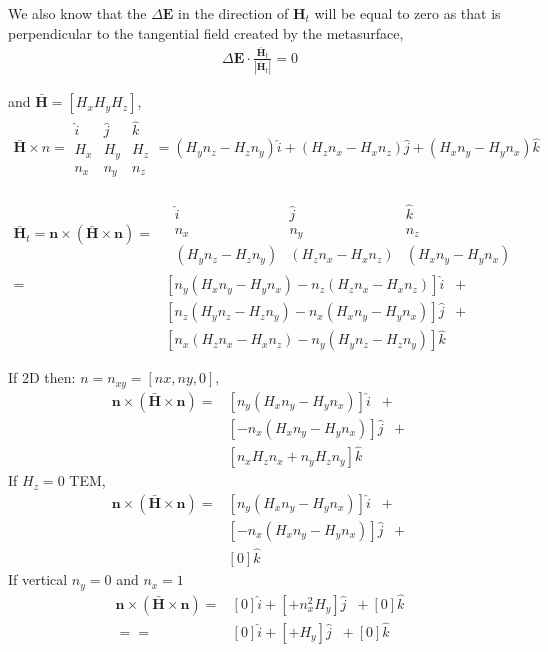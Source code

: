 \documentclass{article}
\newcommand{\E}{\mathbf{E}}
\renewcommand{\H}{\mathbf{H}}
\newcommand{\Hb}{\mathbf{\bar H}}
\newcommand{\n}{\mathbf{n}}
\newcommand{\DE}{\Delta \E}
\renewcommand{\H}{\mathbf{H}}
\newcommand{\0}{\varnothing}
\begin{document}
We also know that the $\DE$ in the direction of $\H_{t}$ will be equal to zero as that is perpendicular to the tangential field created by the metasurface,
\begin{align*}
\DE \cdot \frac{\Hb_t}{|\Hb_t|} = 0
\end{align*}

\newpage
and $\Hb = [H_x H_y H_z]$,
\begin{align*}
    \Hb \times n = 
    \begin{array}{|ccc|}
    \hat i & \hat j & \hat k\\
    H_x & H_y & H_z \\
        n_x & n_y & n_z     
    \end{array}
    = (H_y n_z - H_z n_y) \hat i + (H_z n_x - H_x n_z) \hat j + (H_x n_y - H_y n_x) \hat k
\end{align*}

\begin{align*}
    \Hb_t = \n \times (\Hb \times \n) = &\;\begin{array}{|ccc|}
    \hat i & \hat j & \hat k\\
    n_x & n_y & n_z     \\
    (H_y n_z - H_z n_y) & (H_z n_x - H_x n_z) & (H_x n_y - H_y n_x)
    \end{array}\\
     = &\left[n_y (H_x n_y - H_y n_x) - n_z (H_z n_x - H_x n_z) \right] \hat i \;\; + \\
	   &\left[n_z (H_y n_z - H_z n_y) - n_x (H_x n_y - H_y n_x)\right] \hat j \;\; + \\
	   &\left[n_x (H_z n_x - H_x n_z) - n_y (H_y n_z - H_z n_y) \right] \hat k
\end{align*}

If 2D then: $n = n_{xy} = [nx,ny,0]$,
\begin{align*}
    \n \times (\Hb \times \n) 
     = &\left[n_y (H_x n_y - H_y n_x) \right] \hat i \;\; + \\
	   &\left[ - n_x (H_x n_y - H_y n_x)\right] \hat j \;\; + \\
	   &\left[n_x H_z n_x + n_y  H_z n_y \right] \hat k
\end{align*}
If $H_z = 0$ TEM, 
\begin{align*}
    \n \times (\Hb \times \n) 
     = &\left[n_y (H_x n_y - H_y n_x) \right] \hat i \;\; + \\
	   &\left[ - n_x (H_x n_y - H_y n_x)\right] \hat j \;\; + \\
	   &\left[0 \right] \hat k
\end{align*}
If vertical $n_y = 0$ and $n_x = 1$
\begin{align*}
    \n \times (\Hb \times \n) 
     = &\left[0 \right] \hat i + 
	   \left[ + n_x^2 H_y \right] \hat j \;\; + 
	   \left[0 \right] \hat k\\
	   == &\left[0 \right] \hat i + 
	   \left[ +  H_y \right] \hat j \;\; + 
	   \left[0 \right] \hat k\\	   
\end{align*}
\end{document}
